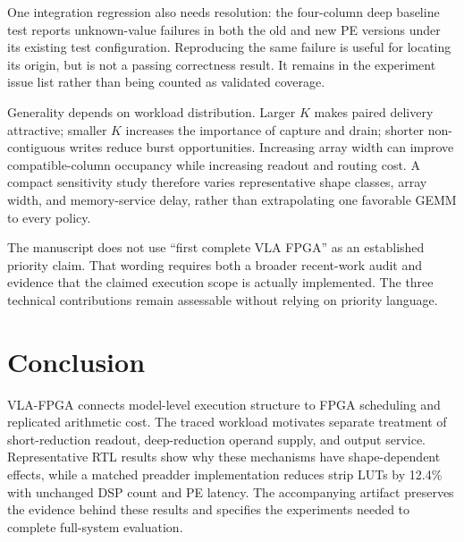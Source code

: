 \documentclass[10pt,conference,letterpaper]{IEEEtran}
\begin{document}
One integration regression also needs resolution: the four-column deep baseline test reports unknown-value failures in both the old and new PE versions under its existing test configuration. Reproducing the same failure is useful for locating its origin, but is not a passing correctness result. It remains in the experiment issue list rather than being counted as validated coverage.

Generality depends on workload distribution. Larger $K$ makes paired delivery attractive; smaller $K$ increases the importance of capture and drain; shorter non-contiguous writes reduce burst opportunities. Increasing array width can improve compatible-column occupancy while increasing readout and routing cost. A compact sensitivity study therefore varies representative shape classes, array width, and memory-service delay, rather than extrapolating one favorable GEMM to every policy.

The manuscript does not use ``first complete VLA FPGA'' as an established priority claim. That wording requires both a broader recent-work audit and evidence that the claimed execution scope is actually implemented. The three technical contributions remain assessable without relying on priority language.

\section{Conclusion}
VLA-FPGA connects model-level execution structure to FPGA scheduling and replicated arithmetic cost. The traced workload motivates separate treatment of short-reduction readout, deep-reduction operand supply, and output service. Representative RTL results show why these mechanisms have shape-dependent effects, while a matched preadder implementation reduces strip LUTs by 12.4\% with unchanged DSP count and PE latency. The accompanying artifact preserves the evidence behind these results and specifies the experiments needed to complete full-system evaluation.



\end{document}
